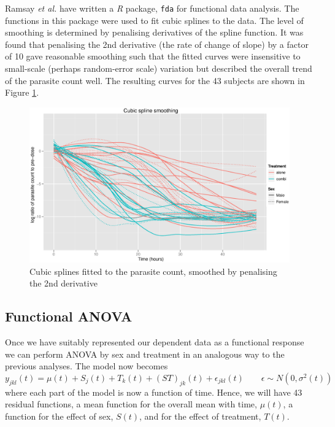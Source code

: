 Ramsay \textit{et al.} have written a \emph{R} package, \texttt{fda} \cite{fdaR, fdaRbook} for functional data analysis. The functions in this package were used to fit cubic splines to the data. The level of smoothing is determined by penalising derivatives of the spline function. It was found that penalising the 2nd derivative (the rate of change of slope) by a factor of 10 gave reasonable smoothing such that the fitted curves were insensitive to small-scale (perhaps random-error scale) variation but described the overall trend of the parasite count well. The resulting curves for the 43 subjects are shown in Figure \ref{cubicspline}.
\begin{figure}[h]
\includegraphics[width=150mm]{cubicspline.eps} 
\caption{Cubic splines fitted to the parasite count, smoothed by penalising the 2nd derivative}
\label{cubicspline}
\end{figure}

\subsection{Functional ANOVA}
Once we have suitably represented our dependent data as a functional response we can perform ANOVA by sex and treatment in an analogous way to the previous analyses. The model now becomes
\begin{equation}
y_{jkl}(t)=\mu(t)+S_{j}(t)+T_{k}(t)+(ST)_{jk}(t)+\epsilon_{jkl}(t)\quad\quad\epsilon\sim N(0, \sigma^{2}(t))\label{aovfda}
\end{equation}
where each part of the model is now a function of time. Hence, we will have 43 residual functions, a mean function for the overall mean with time, $\mu(t)$, a function for the effect of sex, $S(t)$, and for the effect of treatment, $T(t)$.

